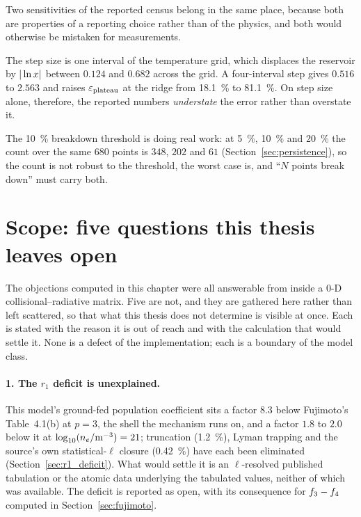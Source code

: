 \medskip
Two sensitivities of the reported census belong in the same place, because both
are properties of a reporting choice rather than of the physics, and both would
otherwise be mistaken for measurements.

The step size is one interval of the temperature grid, which displaces the
reservoir by $|\ln x|$ between $0.124$ and $0.682$ across the grid. A
four-interval step gives $0.516$ to $2.563$ and raises $\varepsilon_{\mathrm{plateau}}$ at the ridge
from \SI{18.1}{\percent} to \SI{81.1}{\percent}. On step size alone, therefore,
the reported numbers \emph{understate} the error rather than overstate it.

The \SI{10}{\percent} breakdown threshold is doing real work: at \SI{5}{\percent},
\SI{10}{\percent} and \SI{20}{\percent} the count over the same $680$ points is
$348$, $202$ and $61$ (Section~\ref{sec:persistence}), so the count is not robust
to the threshold, the worst case is, and ``$N$ points break down'' must carry both.

\section{Scope: five questions this thesis leaves open}
\label{sec:scope_open}

The objections computed in this chapter were all answerable from inside a
$0$-D collisional--radiative matrix. Five are not, and they are gathered here
rather than left scattered, so that what this thesis does not determine is
visible at once. Each is stated with the reason it is out of reach and with
the calculation that would settle it. None is a defect of the implementation;
each is a boundary of the model class.

\paragraph{1. The $r_1$ deficit is unexplained.} This model's ground-fed
population coefficient sits a factor $8.3$ below Fujimoto's Table~4.1(b) at
$p=3$, the shell the mechanism runs on, and a factor $1.8$ to $2.0$ below it at
$\log_{10}(n_e/\si{\per\cubic\metre}) = 21$; truncation (\SI{1.2}{\percent}),
Lyman trapping and the source's own statistical-$\ell$ closure
(\SI{0.42}{\percent}) have each been eliminated (Section~\ref{sec:r1_deficit}).
What would settle it is an $\ell$-resolved published tabulation or the atomic
data underlying the tabulated values, neither of which was available. The
deficit is reported as open, with its consequence for $f_{3}-f_{4}$
computed in Section~\ref{sec:fujimoto}.

